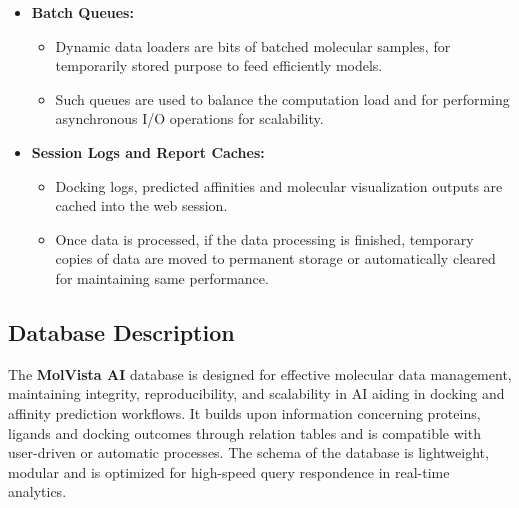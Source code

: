 \documentclass[12pt,a4]{report}
\begin{document}
\begin{enumerate}[label=\textbf{\Alph*.}, leftmargin=1.2cm]
\begin{itemize}
        \item \textbf{Batch Queues:}
        \begin{itemize}
            \item Dynamic data loaders are bits of batched molecular samples, for temporarily stored purpose to feed efficiently models.
            \item Such queues are used to balance the computation load and for performing asynchronous I/O operations for scalability.
        \end{itemize}

        \item \textbf{Session Logs and Report Caches:}
        \begin{itemize}
            \item Docking logs, predicted affinities and molecular visualization outputs are cached into the web session.
            \item Once data is processed, if the data processing is finished, temporary copies of data are moved to permanent storage or automatically cleared for maintaining same performance.
        \end{itemize}
    \end{itemize}
\end{enumerate}

\subsection{Database Description}

\vspace{0.3cm}
\hspace{0.3in} The \textbf{MolVista AI} database is designed for effective molecular data management, maintaining integrity, reproducibility, and scalability in AI aiding in docking and affinity prediction workflows. It builds upon information concerning proteins, ligands and docking outcomes through relation tables and is compatible with user-driven or automatic processes. The schema of the database is lightweight, modular and is optimized for high-speed query respondence in real-time analytics.
\end{document}
